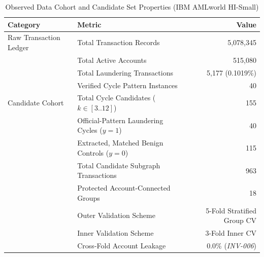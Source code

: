\begin{table}[htbp]
\centering
\caption{Observed Data Cohort and Candidate Set Properties (IBM AMLworld HI-Small)}
\label{tab:cohort_stats}
\begin{tabular}{llr}
\hline
\textbf{Category} & \textbf{Metric} & \textbf{Value} \\
\hline
Raw Transaction Ledger & Total Transaction Records & 5,078,345 \\
 & Total Active Accounts & 515,080 \\
 & Total Laundering Transactions & 5,177 (0.1019\%) \\
 & Verified Cycle Pattern Instances & 40 \\
\hline
Candidate Cohort & Total Cycle Candidates ($k \in [3..12]$) & 155 \\
 & Official-Pattern Laundering Cycles ($y=1$) & 40 \\
 & Extracted, Matched Benign Controls ($y=0$) & 115 \\
 & Total Candidate Subgraph Transactions & 963 \\
 & Protected Account-Connected Groups & 18 \\
 & Outer Validation Scheme & 5-Fold Stratified Group CV \\
 & Inner Validation Scheme & 3-Fold Inner CV \\
 & Cross-Fold Account Leakage & 0.0\% (\textit{INV-006}) \\
\hline
\end{tabular}
\end{table}
